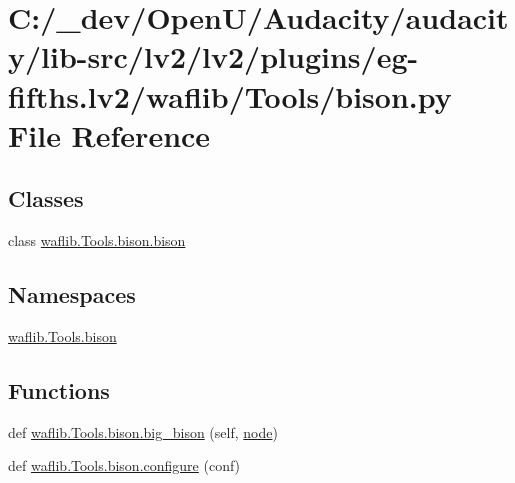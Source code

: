 \hypertarget{lv2_2plugins_2eg-fifths_8lv2_2waflib_2_tools_2bison_8py}{}\section{C\+:/\+\_\+dev/\+Open\+U/\+Audacity/audacity/lib-\/src/lv2/lv2/plugins/eg-\/fifths.lv2/waflib/\+Tools/bison.py File Reference}
\label{lv2_2plugins_2eg-fifths_8lv2_2waflib_2_tools_2bison_8py}
\subsection*{Classes}
\begin{DoxyCompactItemize}
\item 
class \hyperlink{classwaflib_1_1_tools_1_1bison_1_1bison}{waflib.\+Tools.\+bison.\+bison}
\end{DoxyCompactItemize}
\subsection*{Namespaces}
\begin{DoxyCompactItemize}
\item 
 \hyperlink{namespacewaflib_1_1_tools_1_1bison}{waflib.\+Tools.\+bison}
\end{DoxyCompactItemize}
\subsection*{Functions}
\begin{DoxyCompactItemize}
\item 
def \hyperlink{namespacewaflib_1_1_tools_1_1bison_ab34716254c6b552f235c340bad47b596}{waflib.\+Tools.\+bison.\+big\+\_\+bison} (self, \hyperlink{structnode}{node})
\item 
def \hyperlink{namespacewaflib_1_1_tools_1_1bison_af8585015f181d6117510d086dd42623a}{waflib.\+Tools.\+bison.\+configure} (conf)
\end{DoxyCompactItemize}
